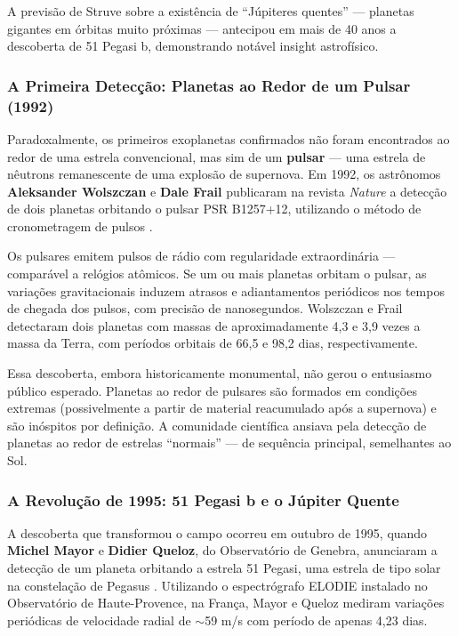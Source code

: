\documentclass[
	12pt,
	openany,
	oneside,
	a4paper,
	english,
	brazil
]{abntex2}
\begin{document}
A previsão de Struve sobre a existência de ``Júpiteres quentes'' --- planetas gigantes em órbitas muito próximas --- antecipou em mais de 40 anos a descoberta de 51 Pegasi b, demonstrando notável insight astrofísico.

\subsubsection{A Primeira Detecção: Planetas ao Redor de um Pulsar (1992)}

Paradoxalmente, os primeiros exoplanetas confirmados não foram encontrados ao redor de uma estrela convencional, mas sim de um \textbf{pulsar} --- uma estrela de nêutrons remanescente de uma explosão de supernova. Em 1992, os astrônomos \textbf{Aleksander Wolszczan} e \textbf{Dale Frail} publicaram na revista \textit{Nature} a detecção de dois planetas orbitando o pulsar PSR B1257+12, utilizando o método de cronometragem de pulsos \cite{wolszczan1992}.

Os pulsares emitem pulsos de rádio com regularidade extraordinária --- comparável a relógios atômicos. Se um ou mais planetas orbitam o pulsar, as variações gravitacionais induzem atrasos e adiantamentos periódicos nos tempos de chegada dos pulsos, com precisão de nanosegundos. Wolszczan e Frail detectaram dois planetas com massas de aproximadamente 4,3 e 3,9 vezes a massa da Terra, com períodos orbitais de 66,5 e 98,2 dias, respectivamente.

Essa descoberta, embora historicamente monumental, não gerou o entusiasmo público esperado. Planetas ao redor de pulsares são formados em condições extremas (possivelmente a partir de material reacumulado após a supernova) e são inóspitos por definição. A comunidade científica ansiava pela detecção de planetas ao redor de estrelas ``normais'' --- de sequência principal, semelhantes ao Sol.

\subsubsection{A Revolução de 1995: 51 Pegasi b e o Júpiter Quente}

A descoberta que transformou o campo ocorreu em outubro de 1995, quando \textbf{Michel Mayor} e \textbf{Didier Queloz}, do Observatório de Genebra, anunciaram a detecção de um planeta orbitando a estrela 51 Pegasi, uma estrela de tipo solar na constelação de Pegasus \cite{mayor1995}. Utilizando o espectrógrafo ELODIE instalado no Observatório de Haute-Provence, na França, Mayor e Queloz mediram variações periódicas de velocidade radial de $\sim$59 m/s com período de apenas 4,23 dias.
\end{document}
